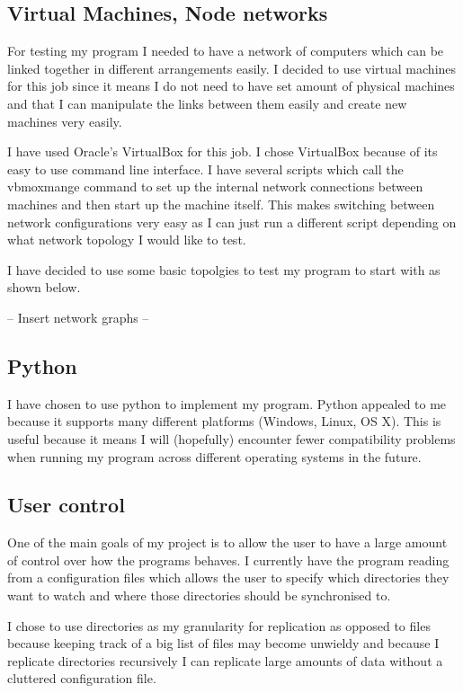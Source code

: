 \documentclass[12pt]{article}
\begin{document}
\subsection{Virtual Machines, Node networks}
For testing my program I needed to have a network
of computers which can be linked together in different
arrangements easily. I decided to use virtual machines for
this job since it means I do not need to have set amount
of physical machines and that I can manipulate the
links between them easily and create new machines very easily. 

I have used Oracle's VirtualBox for this job. I chose
VirtualBox because of its easy to use command
line interface. I have several scripts which
call the vbmoxmange command to set up the internal
network connections between machines and then start up
the machine itself. This makes switching between
network configurations very easy as I can just
run a different script depending on what network
topology I would like to test.

I have decided to use some basic topolgies to
test my program to start with as shown below.

-- Insert network graphs --

\subsection{Python}
I have chosen to use python to implement
my program. Python appealed to me because it
supports many different platforms (Windows, Linux, OS X).
This is useful because it means I will (hopefully)
encounter fewer compatibility problems when running
my program across different operating systems in the future.

\subsection{User control}
One of the main goals of my project is to allow the user
to have a  large amount of control over how the programs
behaves. I currently have the program reading from a
configuration files which allows the user to specify
which directories they want to watch and where those
directories should be synchronised to.

I chose to use directories as my granularity for replication
as opposed to files because keeping track of a big list
of files may become unwieldy and because I replicate
directories recursively I can replicate large amounts
of data without a cluttered configuration file.
\end{document}
